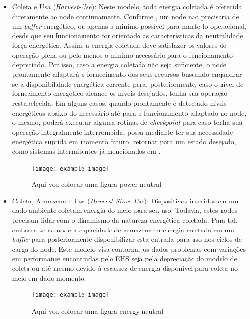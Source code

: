 \begin{itemize}
    \item Coleta e Usa (\textit{Harvest-Use}): Neste modelo, toda energia coletada é oferecida diretamente ao node continuamente. Conforme \cite{merrett_energy-driven_2017}, um node não precisaria de um \textit{buffer} energético, ou apenas o minimo possível para mante-lo operacional, desde que seu funcionamento for orientado as características da neutralidade força-energética. Assim, a energia coletada deve satisfazer os valores de operação plena ou pelo menos o minimo necessário para o funcionamento depreciado. Por isso, caso a energia coletada não seja suficiente, o node prontamente adaptará o fornecimento dos seus recursos buscando enquadrar-se a disponibilidade energética corrente para, posteriormente, caso o nível de fornecimento energético alcance os níveis desejados, tenha sua operação restabelecida. Em alguns casos, quando prontamente é detectado níveis energéticos abaixo do necessário até para o funcionamento adaptado no node, o mesmo, poderá executar alguma rotinas de \textit{checkpoint} para caso tenha sua operação integralmente interrompida, possa mediante ter sua necessidade energética suprida em momento futuro, retornar para um estado desejado, como sistemas intermitentes já mencionados em \cite{sliper_energy-driven_2020}.
    
	\begin{figure}[h]
			\centering
			\noindent\texttt{[image: example-image]} 
			\caption{Aqui vou colocar uma figura power-neutral}	
	\end{figure}   
    
    \item Coleta, Armazena e Usa (\textit{Harvest-Store Use}): Dispositivos inseridos em um dado ambiente coletam energia do meio para seu uso. Todavia, estes nodes precisam lidar com o dinamismo da natureza energética coletada. Para tal, embarca-se ao node a capacidade de armazenar a energia coletada em um \textit{buffer} para posteriormente disponibilizar esta entrada para uso nos ciclos de carga do node. Este modelo visa contornar os dados problemas com variações em performance encontradas pelo \acs{EHS} seja pela depreciação do modelo de coleta ou até mesmo devido à escassez de energia disponível para coleta no meio em dado momento.
    
    \begin{figure}[h]
    	\centering
    	\noindent\texttt{[image: example-image]} 
    	\caption{Aqui vou colocar uma figura energy-neutral}	
   	\end{figure}  
    
\end{itemize}


